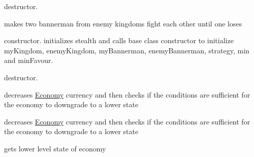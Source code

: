 \begin{DoxyRefList}
%
destructor.  
\item[Member \mbox{\hyperlink{class_battle_field_a0a0ea58914a59f8d385041f454ffe6d0}{Battle\+Field\+::attack}} (\mbox{\hyperlink{class_bannerman}{Bannerman}} $\ast$my\+Bannerman, \mbox{\hyperlink{class_bannerman}{Bannerman}} $\ast$enemy\+Bannerman)]\label{todo__todo000008}%
%
makes two bannerman from enemy kingdoms fight each other until one loses  
\item[Member \mbox{\hyperlink{class_battle_field_a602131021b381a1c83e11635491ecfa5}{Battle\+Field\+::Battle\+Field}} (\mbox{\hyperlink{class_kingdom}{Kingdom}} $\ast$my\+Kingdom, \mbox{\hyperlink{class_kingdom}{Kingdom}} $\ast$enemy\+Kingdom, \mbox{\hyperlink{class_bannerman}{Bannerman}} $\ast$my\+Bannerman, \mbox{\hyperlink{class_bannerman}{Bannerman}} $\ast$enemy\+Bannerman, string name, int min, int min\+Favour)]\label{todo__todo000007}%
%
constructor. initializes stealth and calls base class constructor to initialize my\+Kingdom, enemy\+Kingdom, my\+Bannerman, enemy\+Bannerman, strategy, min and min\+Favour.  
\item[Member \mbox{\hyperlink{class_battle_field_adf5797b1520be6502b828196690b9348}{Battle\+Field\+::$\sim$\+Battle\+Field}} ()]\label{todo__todo000009}%
%
destructor.  
\item[Member \mbox{\hyperlink{class_failed_state_afaaef228a607bb585a980642985d18a2}{Failed\+State\+::decrease\+Currency}} ()]\label{todo__todo000010}%
%
decreases \mbox{\hyperlink{class_economy}{Economy}} currency and then checks if the conditions are sufficient for the economy to downgrade to a lower state  
\item[Member \mbox{\hyperlink{class_healthy_state_a5f75e1935e20ed34b73d259a2324e4f9}{Healthy\+State\+::decrease\+Currency}} ()]\label{todo__todo000011}%
%
decreases \mbox{\hyperlink{class_economy}{Economy}} currency and then checks if the conditions are sufficient for the economy to downgrade to a lower state  
\item[Member \mbox{\hyperlink{class_healthy_state_a97583e0f477b87971b3a586ef1ba89e6}{Healthy\+State\+::get\+Demotion\+State}} ()]\label{todo__todo000012}%
%
gets lower level state of economy  
\item[Member \mbox{\hyperlink{class_kingdom_a434e87f15f449ee199ab3a1ddfe2f0f6}{Kingdom\+::$\sim$\+Kingdom}} ()]\label{todo__todo000013}%

\end{DoxyRefList}
